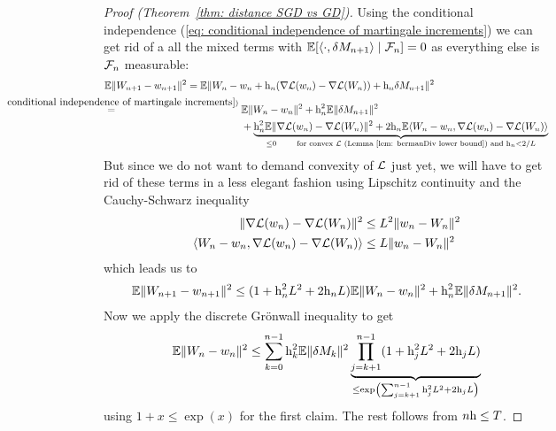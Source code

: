 \begin{proof}[Proof (Theorem~\ref{thm: distance SGD vs GD})]
	Using the conditional independence (\ref{eq: conditional independence of martingale increments})
	we can get rid of a all the mixed terms with
	\(\mathbb{E}[\langle \cdot, \delta M_{n+1}\rangle\mid\mathcal{F}_n]=0\) as everything
	else is \(\mathcal{F}_n\) measurable:
	\begin{align*}
		&\E\|\Weights_{n+1}-\weights_{n+1}\|^2
		= \E\|\Weights_n - \weights_n
		+ \lr_n(\nabla\Loss(\weights_n)-\nabla\Loss(\Weights_n))
		+ \lr_n\martIncr_{n+1}\|^2\\
		&\lxeq{(\ref{eq: conditional independence of martingale increments})}
		\begin{aligned}[t]
			&\E\|\Weights_n-\weights_n\|^2 + \lr_n^2\E\|\martIncr_{n+1}\|^2\\
			&+\underbrace{
				\lr_n^2\E\|\nabla\Loss(\weights_n)-\nabla\Loss(\Weights_n)\|^2
				+ 2\lr_n\E\langle\Weights_n-\weights_n,
				\nabla\Loss(\weights_n)-\nabla\Loss(\Weights_n)\rangle
			}_{
				\le 0 \qquad
				\text{for convex \(\Loss\) (Lemma~\ref{lem: bermanDiv lower bound}) and }
				\lr_n<2/\ubound
			}
		\end{aligned}
	\end{align*}
	But since we do not want to demand convexity of \(\mathcal{L}\) just yet, we will
	have to get rid of these terms in a less elegant fashion using Lipschitz
	continuity and the Cauchy-Schwarz inequality
	\begin{align*}
		\|\nabla\mathcal{L}(w_n)-\nabla\mathcal{L}(W_n)\|^2
		&\le L^2\|w_n-W_n\|^2\\
		\langle W_n-w_n,
		\nabla\mathcal{L}(w_n)-\nabla\mathcal{L}(W_n)\rangle
		&\le L \|w_n-W_n\|^2
	\end{align*}
	which leads us to
	\begin{align*}
		\mathbb{E}\|W_{n+1}-w_{n+1}\|^2
		\le (1+\text{h}_n^2L^2 + 2\text{h}_nL)\mathbb{E}\|W_n-w_n\|^2
		+ \text{h}_n^2\mathbb{E}\|\delta M_{n+1}\|^2.
	\end{align*}
	Now we apply the discrete Gr\"onwall inequality to get
	\begin{align*}
		\mathbb{E}\|W_n-w_n\|^2
		\le \sum_{k=0}^{n-1}\text{h}_k^2\mathbb{E}\|\delta M_k\|^2
		\underbrace{
			\prod_{j=k+1}^{n-1}(1+\text{h}_j^2L^2 + 2\text{h}_jL)
		}_{
			\le \exp\left(\sum_{j=k+1}^{n-1}\text{h}_j^2L^2 + 2\text{h}_jL\right)
		}
	\end{align*}
	using \(1+x\le\exp(x)\) for the first claim. The rest 
	follows from \(n\text{h}\le T\).
\end{proof}

